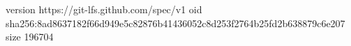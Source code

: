 version https://git-lfs.github.com/spec/v1
oid sha256:8ad8637182f66d949e5c82876b41436052c8d253f2764b25fd2b638879c6e207
size 196704
